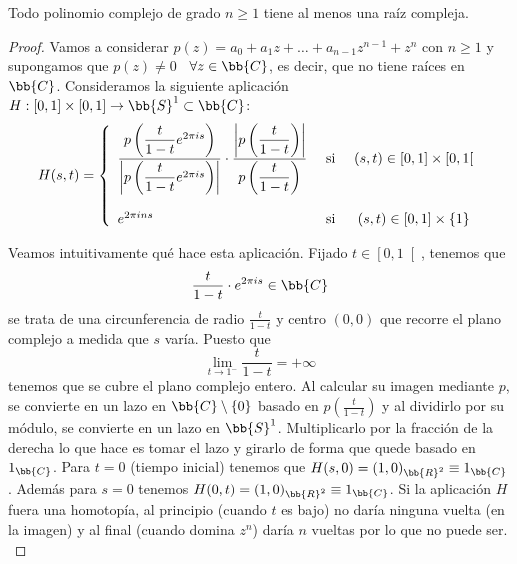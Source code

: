 \begin{teo}
    Todo polinomio complejo de grado $n \geq 1$ tiene al menos una raíz compleja.
    \begin{proof}
        Vamos a considerar $p(z) = a_0+a_1z + \dots + a_{n-1}z^{n-1} + z^n$ con $n\geq 1$ y supongamos que $p(z)\neq 0$ \ $\forall z \in \bb{C}$, es decir, que no tiene raíces en $\bb{C}$. Consideramos la siguiente aplicación $H:[0,1]\times [0,1] \to \bb{S}^1\subset \bb{C}$:
        \begin{gather*}
            H(s,t) = \left\{
                \begin{array}{l c c}
                    \dfrac{p\left(\dfrac{t}{1-t} e^{2\pi i s}\right)}{\left|p\left(\dfrac{t}{1-t} e^{2\pi i s}\right)\right|}\cdot \dfrac{\left|p\left(\dfrac{t}{1-t}\right)\right|}{p\left(\dfrac{t}{1-t}\right)} & \text{ si } & (s,t)\in [0,1]\times [0,1[\\\\
                    e^{2\pi i n s} & \text{ si } & (s,t)\in [0,1]\times\{1\}
                \end{array}
            \right.
        \end{gather*}

        Veamos intuitivamente qué hace esta aplicación. Fijado $t\in \left[0,1\right[$, tenemos que
        \begin{gather*}
            \dfrac{t}{1-t}\cdot e^{2\pi i s} \in \bb{C}
        \end{gather*}
        se trata de una circunferencia de radio $\frac{t}{1-t}$ y centro $(0,0)$ que recorre el plano complejo a medida que $s$ varía. Puesto que
        \begin{equation*}
            \lim_{t\to 1^-} \frac{t}{1-t} = +\infty
        \end{equation*}
        tenemos que se cubre el plano complejo entero. Al calcular su imagen mediante $p$, se convierte en un lazo en $\bb{C}\setminus \{0\}$ basado en $p\left(\frac{t}{1-t}\right)$ y al dividirlo por su módulo, se convierte en un lazo en $\bb{S}^1$. Multiplicarlo por la fracción de la derecha lo que hace es tomar el lazo y girarlo de forma que quede basado en $1_{\bb{C}}$. Para $t=0$ (tiempo inicial) tenemos que $H(s,0) = (1,0)_{\bb{R}^2} \equiv 1_{\bb{C}}$. Además para $s=0$ tenemos $H(0,t) = (1,0)_{\bb{R}^2} \equiv 1_{\bb{C}}$. Si la aplicación $H$ fuera una homotopía, al principio (cuando $t$ es bajo) no daría ninguna vuelta (en la imagen) y al final (cuando domina $z^n$) daría $n$ vueltas por lo que no puede ser.\\


\end{proof}
\end{teo}
